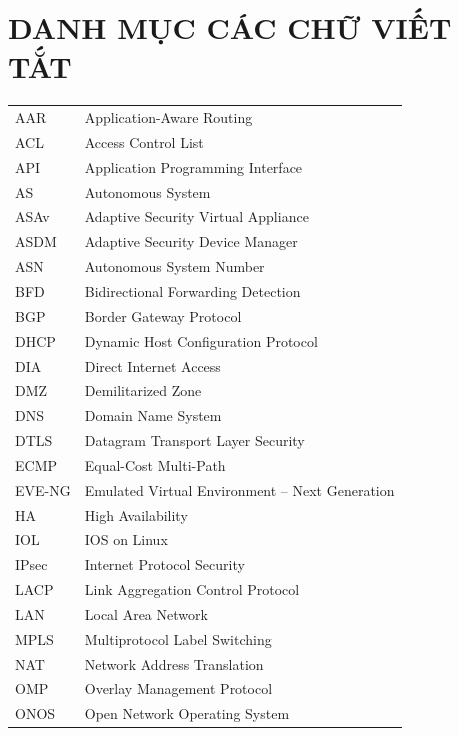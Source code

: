 \newpage
\section*{DANH MỤC CÁC CHỮ VIẾT TẮT}

{
\renewcommand{\tabletextsize}{\linespread{1.0}\normalsize}
\setlength{\LTleft}{0pt}
\renewcommand{\arraystretch}{0.9}
\begin{longtable}{ @{}p{3cm} p{12cm}@{} }
    AAR & Application-Aware Routing \\
    ACL & Access Control List \\
    API & Application Programming Interface \\
    AS & Autonomous System \\
    ASAv & Adaptive Security Virtual Appliance \\
    ASDM & Adaptive Security Device Manager \\
    ASN & Autonomous System Number \\
    BFD & Bidirectional Forwarding Detection \\
    BGP & Border Gateway Protocol \\
    DHCP & Dynamic Host Configuration Protocol \\
    DIA & Direct Internet Access \\
    DMZ & Demilitarized Zone \\
    DNS & Domain Name System \\
    DTLS & Datagram Transport Layer Security \\
    ECMP & Equal-Cost Multi-Path \\
    EVE-NG & Emulated Virtual Environment -- Next Generation \\
    HA & High Availability \\
    IOL & IOS on Linux \\
    IPsec & Internet Protocol Security \\
    LACP & Link Aggregation Control Protocol \\
    LAN & Local Area Network \\
    MPLS & Multiprotocol Label Switching \\
    NAT & Network Address Translation \\
    OMP & Overlay Management Protocol \\
    ONOS & Open Network Operating System \\

\end{longtable}}
